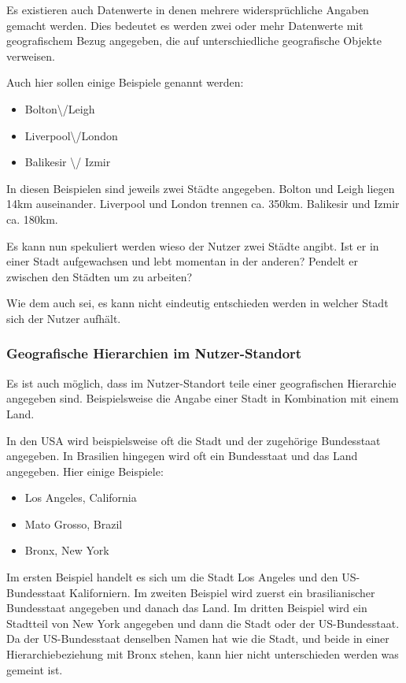 				Es existieren auch Datenwerte in denen mehrere widersprüchliche Angaben gemacht werden.
				Dies bedeutet es werden zwei oder mehr Datenwerte mit geografischem Bezug angegeben, die auf unterschiedliche geografische Objekte verweisen.

				Auch hier sollen einige Beispiele genannt werden:

				\begin{itemize}
					\item Bolton\textbackslash/Leigh
					\item Liverpool\textbackslash/London
					\item  Balikesir \textbackslash/ Izmir	
				\end{itemize}							
					
				In diesen Beispielen sind jeweils zwei Städte angegeben.
				Bolton und Leigh liegen 14km auseinander.
				Liverpool und London trennen ca. 350km.
				Balikesir und Izmir ca. 180km.

				Es kann nun spekuliert werden wieso der Nutzer zwei Städte angibt.
				Ist er in einer Stadt aufgewachsen und lebt momentan in der anderen?
				Pendelt er zwischen den Städten um zu arbeiten?

				Wie dem auch sei, es kann nicht eindeutig entschieden werden in welcher Stadt sich der Nutzer aufhält.

			\subsubsection*{Geografische Hierarchien im Nutzer-Standort}

				Es ist auch möglich, dass im Nutzer-Standort teile einer geografischen Hierarchie angegeben sind.
				Beispielsweise die Angabe einer Stadt in Kombination mit einem Land.
				
				In den USA wird beispielsweise oft die Stadt und der zugehörige Bundesstaat angegeben.
				In Brasilien hingegen wird oft ein Bundesstaat und das Land angegeben.
				Hier einige Beispiele:

				\begin{itemize}
					\item Los Angeles, California
					\item Mato Grosso, Brazil
					\item Bronx, New York	
				\end{itemize}		

				Im ersten Beispiel handelt es sich um die Stadt Los Angeles und den US-Bundesstaat Kaliforniern.
				Im zweiten Beispiel wird zuerst ein brasilianischer Bundesstaat angegeben und danach das Land.
				Im dritten Beispiel wird ein Stadtteil von New York angegeben und dann die Stadt oder der US-Bundesstaat. 
				Da der US-Bundesstaat denselben Namen hat wie die Stadt, und beide in einer Hierarchiebeziehung mit Bronx stehen, kann hier nicht unterschieden werden was gemeint ist.
				
